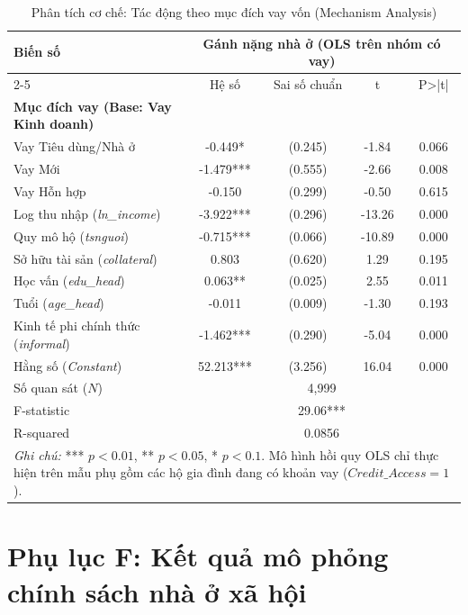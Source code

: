 \documentclass[12pt,a4paper]{report}
\begin{document}
\vspace{1em}

\begin{table}[htbp]
	\centering
	\caption{Phân tích cơ chế: Tác động theo mục đích vay vốn (Mechanism Analysis)}
	\label{tab:mechanism}
	\small
	\begin{tabular}{lcccc}
		\toprule
		\multirow{2}{*}{\textbf{Biến số}} & \multicolumn{4}{c}{\textbf{Gánh nặng nhà ở (OLS trên nhóm có vay)}} \\
		\cmidrule{2-5}
		& Hệ số & Sai số chuẩn & t & P>|t| \\
		\midrule
		\textbf{Mục đích vay (Base: Vay Kinh doanh)} & & & & \\
		Vay Tiêu dùng/Nhà ở & -0.449* & (0.245) & -1.84 & 0.066 \\
		Vay Mới & -1.479*** & (0.555) & -2.66 & 0.008 \\
		Vay Hỗn hợp & -0.150 & (0.299) & -0.50 & 0.615 \\
		\midrule
		Log thu nhập (\textit{ln\_income}) & -3.922*** & (0.296) & -13.26 & 0.000 \\
		Quy mô hộ (\textit{tsnguoi}) & -0.715*** & (0.066) & -10.89 & 0.000 \\
		Sở hữu tài sản (\textit{collateral}) & 0.803 & (0.620) & 1.29 & 0.195 \\
		Học vấn (\textit{edu\_head}) & 0.063** & (0.025) & 2.55 & 0.011 \\
		Tuổi (\textit{age\_head}) & -0.011 & (0.009) & -1.30 & 0.193 \\
		Kinh tế phi chính thức (\textit{informal}) & -1.462*** & (0.290) & -5.04 & 0.000 \\
		Hằng số (\textit{Constant}) & 52.213*** & (3.256) & 16.04 & 0.000 \\
		\midrule
		Số quan sát ($N$) & \multicolumn{4}{c}{4,999} \\
		F-statistic & \multicolumn{4}{c}{29.06***} \\
		R-squared & \multicolumn{4}{c}{0.0856} \\
		\bottomrule
		\multicolumn{5}{p{13cm}}{\footnotesize \textit{Ghi chú:} *** $p<0.01$, ** $p<0.05$, * $p<0.1$. Mô hình hồi quy OLS chỉ thực hiện trên mẫu phụ gồm các hộ gia đình đang có khoản vay ($Credit\_Access = 1$).}
	\end{tabular}
\end{table}

\newpage	
\section*{Phụ lục F: Kết quả mô phỏng chính sách nhà ở xã hội}
\end{document}
